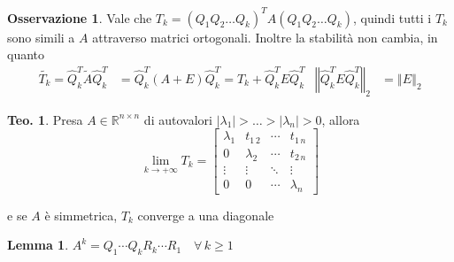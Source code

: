 \documentclass[a4paper,10pt]{article}
\theoremstyle{definition}
\theoremstyle{indentdefinition}
\theoremstyle{indenttheorem}
\newtheorem{thm}{Teo.}
\newtheorem{lem}{Lemma}
\theoremstyle{myremark}
\newtheorem*{rem*}{Osservazione}
\theoremstyle{indentgeneral}
\theoremstyle{plain}
\theoremstyle{plain}
\begin{document}
\begin{rem*}
Vale che $T_{k}=\left(Q_{1}Q_{2}\ldots Q_{k}\right)^{T}A\left(Q_{1}Q_{2}\ldots Q_{k}\right)$,
quindi tutti i $T_{k}$ sono simili a $A$ attraverso matrici ortogonali.
Inoltre la stabilità non cambia, in quanto 
\begin{align*}
\widetilde{T_{k}}=\widehat{Q}_{k}^{T}\widetilde{A}\widehat{Q}_{k}^{T} & =\widehat{Q}_{k}^{T}\left(A+E\right)\widehat{Q}_{k}^{T}=T_{k}+\widehat{Q}_{k}^{T}E\widehat{Q}_{k}^{T} & \left\Vert \widehat{Q}_{k}^{T}E\widehat{Q}_{k}^{T}\right\Vert _{2} & =\left\Vert E\right\Vert _{2}
\end{align*}
\end{rem*}
\begin{thm}
Presa $A\in\mathbb{R}^{n\times n}$ di autovalori $\left|\lambda_{1}\right|>\ldots>\left|\lambda_{n}\right|>0$,
allora 
\[
\lim_{k\rightarrow+\infty}T_{k}=\begin{bmatrix}\lambda_{1} & t_{1\,2} & \cdots & t_{1\,n}\\
0 & \lambda_{2} & \cdots & t_{2\,n}\\
\vdots & \vdots & \ddots & \vdots\\
0 & 0 & \cdots & \lambda_{n}
\end{bmatrix}
\]

e se $A$ è simmetrica, $T_{k}$ converge a una diagonale
\end{thm}

\begin{lem}
$A^{k}=Q_{1}{\scriptstyle \cdots}Q_{k}R_{k}{\scriptstyle \cdots}R_{1}\quad\forall\,k\geq1$
\end{lem}
\end{document}
